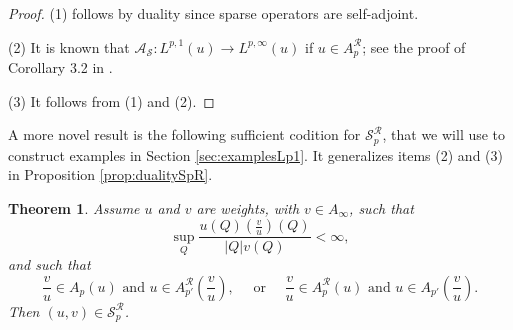 \documentclass[12pt]{amsart}
\theoremstyle{plain}
\newtheorem{theorem}{Theorem}[section]
\theoremstyle{definition}
\numberwithin{equation}{section}
\begin{document}
\begin{proof} (1) follows by duality since sparse operators are self-adjoint. 

\noindent 
(2) It is known that $\mathcal{A}_{\mathcal{S}}\colon L^{p,1}(u)\to L^{p,\infty}(u)$ if $u\in A_{p}^{\mathcal{R}}$; see the proof of Corollary 3.2 in \cite{carroDomingoSalazar}. 

\noindent 
(3)  It follows from (1) and (2).\qedhere

\end{proof}


A more novel result is the following sufficient codition for $\mathcal{S}_p^{\mathcal{R}}$, that we will use to construct examples in Section \ref{sec:examplesLp1}. It generalizes items (2) and (3) in Proposition \ref{prop:dualitySpR}.

\begin{theorem}\label{thm:sufficientConditionSpR}
    Assume $u$ and $v$ are weights, with $v\in A_{\infty}$, such that
    \begin{equation}\label{eq:necessaryWeakConditionSpR}
    \sup_{Q}\displaystyle\frac{u(Q)\left(\frac{v}{u}\right)(Q)}{|Q|v(Q)}
    <
    \infty,    
    \end{equation}
    and such that
    \begin{equation}\label{eq:sufficientConditionSpR}
    \frac{v}{u}\in A_p(u)\text{ and } u\in A_{p'}^{\mathcal{R}}\left(\frac{v}{u}\right),\quad \text{ or }\quad  \frac{v}{u}\in A_p^{\mathcal{R}}(u) \text{ and } u\in A_{p'}\left(\frac{v}{u}\right).        
    \end{equation}
    Then $(u,v)\in \mathcal{S}_p^{\mathcal{R}}$.
\end{theorem}
\end{document}
